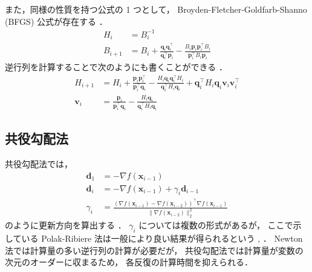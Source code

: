 また，同様の性質を持つ公式の 1 つとして，
Broyden-Fletcher-Goldfarb-Shanno (BFGS) 公式が存在する
\cite[Section 9.4]{Luenberger2003}．
\begin{align}
    H_i &= B_i^{-1} \\
    B_{i+1} &= B_i + \frac{\bm{q}_i \bm{q}_i^\top}{\bm{q}_i^\top \bm{p}_i}
        - \frac{B_i \bm{p}_i \bm{p}_i^\top B_i}{\bm{p}_i^\top B_i \bm{p}_i}
\end{align}
逆行列を計算することで次のようにも書くことができる
\cite[Section 10.9]{Press2007}．
\begin{align}
    H_{i+1} &= H_i + \frac{\bm{p}_i \bm{p}_i^\top}{\bm{p}_i^\top \bm{q}_i}
        - \frac{H_i \bm{q}_i \bm{q}_i^\top H_i}{\bm{q}_i^\top H_i \bm{q}_i}
        + \bm{q}_i^\top H_i \bm{q}_i \bm{v}_i \bm{v}_i^\top \\
    \bm{v}_i &= \frac{\bm{p}_i}{\bm{p}_i^\top \bm{q}_i}
        - \frac{H_i \bm{q}_i}{\bm{q}_i^\top H_i \bm{q}_i}
\end{align}

\subsection{共役勾配法}

共役勾配法では，
\begin{align}
    \bm{d}_1 &= -\nabla f(\bm{x}_{i-1}) \\
    \bm{d}_i &= -\nabla f(\bm{x}_{i-1}) + \gamma_i \bm{d}_{i-1} \\
    \gamma_i &= 
        \frac{(\nabla f(\bm{x}_{i-1}) - \nabla f(\bm{x}_{i-2}))^\top \nabla f(\bm{x}_{i-1})}
        {\|\nabla f(\bm{x}_{i-2})\|_2^2}
\end{align}
のように更新方向を算出する
\cite[Section 8.6]{Luenberger2003}．
$\gamma_i$ については複数の形式があるが，
ここで示している Polak-Ribiere 法は一般により良い結果が得られるという
\cite[Section 8.6]{Luenberger2003}, \cite[Section 10.8]{Press2007}．
Newton 法では計算量の多い逆行列の計算が必要だが，
共役勾配法では計算量が変数の次元のオーダーに収まるため，
各反復の計算時間を抑えられる．
